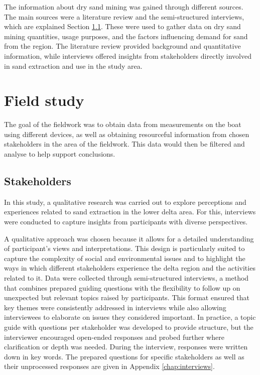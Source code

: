 The information about dry sand mining was gained through different sources. The main sources were a literature review and the semi-structured interviews, which are explained Section \ref{sec:stakeholder methods}. These were used to gather data on dry sand mining quantities, usage purposes, and the factors influencing demand for sand from the region. The literature review provided background and quantitative information, while interviews offered insights from stakeholders directly involved in sand extraction and use in the study area.

\section{Field study}
\label{sec:field study}
The goal of the fieldwork was to obtain data from measurements on the boat using different devices, as well as obtaining resourceful information from chosen stakeholders in the area of the fieldwork. This data would then be filtered and analyse to help support conclusions.

\subsection{Stakeholders}
\label{sec:stakeholder methods}
In this study, a qualitative research was carried out to explore perceptions and experiences related to sand extraction in the lower delta area. For this, interviews were conducted to capture insights from participants with diverse perspectives.

A qualitative approach was chosen because it allows for a detailed understanding of participant's views and interpretations. This design is particularly suited to capture the complexity of social and environmental issues and to highlight the ways in which different stakeholders experience the delta region and the activities related to it. Data were collected through semi-structured interviews, a method that combines prepared guiding questions with the flexibility to follow up on unexpected but relevant topics raised by participants. This format ensured that key themes were consistently addressed in interviews while also allowing interviewees to elaborate on issues they considered important. In practice, a topic guide with questions per stakeholder was developed to provide structure, but the interviewer encouraged open-ended responses and probed further where clarification or depth was needed. During the interview, responses were written down in key words. The prepared questions for specific stakeholders as well as their unprocessed responses are given in Appendix \ref{chap:interviews}.

